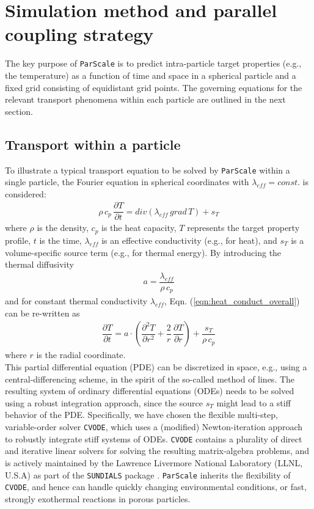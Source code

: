\documentclass{particles2015}
\begin{document}
\section{Simulation method and parallel coupling strategy}
\label{sec:simu_method}
The key purpose of \texttt{ParScale} is to predict intra-particle target properties (e.g., the temperature) as a function of time and space in a spherical particle and a fixed grid consisting of equidistant grid points. The governing equations for the relevant transport phenomena within each particle are outlined in the next section.

\subsection{Transport within a particle}
To illustrate a typical transport equation to be solved by \texttt{ParScale} within a single particle, the Fourier equation in spherical coordinates with $\lambda_{eff} = const.$ is considered:
\begin{align}
\rho \, c_p \, \dfrac{\partial T}{\partial t} = div (\lambda_{eff}\, grad\,T) + s_T
\label{eqn:heat_conduct_overall}
\end{align}
where $\rho$ is the density, $c_p$ is the heat capacity, $T$ represents the target property profile, $t$ is the time, $\lambda_{eff}$ is an effective conductivity (e.g., for heat), and $s_T$ is a volume-specific source term (e.g., for thermal energy). By introducing the thermal diffusivity 
\begin{align}
a = \dfrac{\lambda_{eff}}{\rho \, c_p}
\end{align}
and for constant thermal conductivity $\lambda_{eff}$, Eqn. (\ref{eqn:heat_conduct_overall}) can be re-written as
\begin{align}
 \dfrac{\partial T}{\partial t} =  a \cdot \left( \dfrac{\partial^2 T}{\partial r^2} + \dfrac{2}{r} \, \dfrac{\partial T}{\partial r} \right) + \dfrac{s_T}{\rho \, c_p}
\label{eqn:heatconductradial}
\end{align}
where $r$ is the radial coordinate.  \\
This partial differential equation (PDE) can be discretized in space, e.g., using a central-differencing scheme, in the spirit of the so-called method of lines. The resulting system of ordinary differential equations (ODEs) needs to be solved using a robust integration approach, since the source $s_T$ might lead to a stiff behavior of the PDE. Specifically, we have chosen the flexible multi-step, variable-order solver \texttt{CVODE}, which uses a (modified) Newton-iteration approach to robustly integrate stiff systems of ODEs. \texttt{CVODE} contains a plurality of direct and iterative linear solvers for solving the resulting matrix-algebra problems, and is actively maintained by the Lawrence Livermore National Laboratory (LLNL, U.S.A) as part of the \texttt{SUNDIALS} package  \cite{Cohen1996}. \texttt{ParScale} inherits the flexibility of \texttt{CVODE}, and hence can handle quickly changing environmental conditions, or fast, strongly exothermal reactions in porous particles. \\
\end{document}
